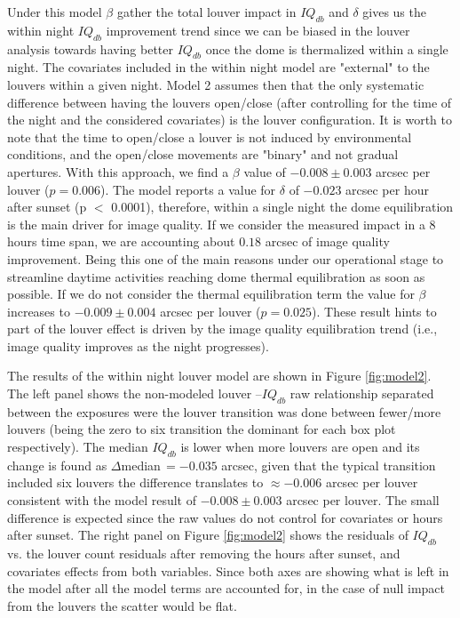 \documentclass[TS,lsstdraft,authoryear,toc]{lsstdoc}
\begin{document}
Under this model $\beta$ gather the total louver impact in $IQ_{db}$ and $\delta$ gives us the within night $IQ_{db}$ improvement trend since we can be biased in the louver analysis towards having better $IQ_{db}$ once the dome is thermalized within a single night. The covariates included in the within night model are "external" to the louvers within a given night. Model 2 assumes then that the only systematic difference between having the louvers open/close (after controlling for the time of the night and the considered covariates) is the louver configuration. It is worth to note that the time to open/close a louver is not induced by environmental conditions, and the open/close movements are "binary" and not gradual apertures. With this approach, we find a $\beta$ value of $-0.008\pm0.003$ arcsec per louver ($p=0.006$). The model reports a value for $\delta$ of  $-0.023$ arcsec per hour after sunset (p $<$ 0.0001), therefore, within a single night the dome equilibration is the main driver for image quality. If we consider the measured impact in a 8 hours time span, we are accounting about $0.18$ arcsec of image quality improvement. Being this one of the main reasons under our operational stage to streamline daytime activities reaching dome thermal equilibration as soon as possible. If we do not consider the thermal equilibration term the value for $\beta$ increases to $-0.009\pm0.004$ arcsec per louver ($p=0.025$). These result hints to part of the louver effect is driven by the image quality equilibration trend (i.e., image quality improves as the night progresses). 

The results of the within night louver model are shown in Figure \ref{fig:model2}.  The left panel shows the non-modeled louver --$IQ_{db}$ raw relationship separated between the exposures were the louver transition was done between fewer/more louvers (being the zero to six transition the dominant for each box plot respectively). The median $IQ_{db}$ is lower when more louvers are open and its change is found as $\Delta$median\,$=-0.035$ arcsec, given that the typical transition included six louvers the difference translates to $\approx -0.006$ arcsec per louver consistent with the model result of $-0.008\pm0.003$ arcsec per louver. The small difference is expected since the raw values do not control for covariates or hours after sunset. The right panel on Figure \ref{fig:model2} shows the residuals of $IQ_{db}$ vs. the louver count residuals after removing the hours after sunset, and covariates effects from both variables. Since both axes are showing what is left in the model after all the model terms are accounted for, in the case of null impact from the louvers the scatter would be flat. 
\end{document}
